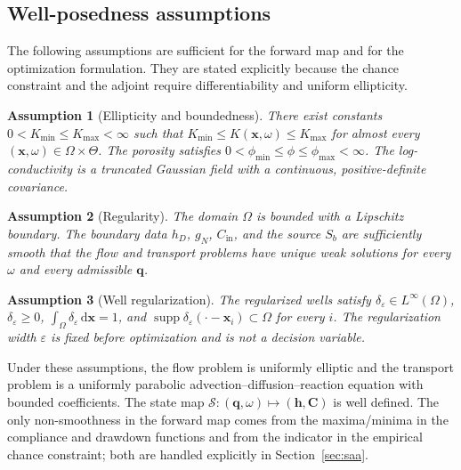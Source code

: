 \documentclass[11pt]{article}
\numberwithin{equation}{section}
\newcommand{\dd}{\,\mathrm{d}}
\newcommand{\xx}{\mathbf{x}}
\theoremstyle{plain}
\newtheorem{assumption}{Assumption}
\begin{document}
\subsection{Well-posedness assumptions}
\label{sec:wellposed}

The following assumptions are sufficient for the forward map and for the
optimization formulation.  They are stated explicitly because the chance
constraint and the adjoint require differentiability and uniform ellipticity.

\begin{assumption}[Ellipticity and boundedness]
\label{ass:elliptic}
There exist constants $0<K_{\min}\le K_{\max}<\infty$ such that
$K_{\min}\le K(\xx,\omega)\le K_{\max}$ for almost every
$(\xx,\omega)\in\Omega\times\Theta$.  The porosity satisfies
$0<\phi_{\min}\le\phi\le\phi_{\max}<\infty$.  The log-conductivity is a
truncated Gaussian field with a continuous, positive-definite covariance.
\end{assumption}

\begin{assumption}[Regularity]
\label{ass:regularity}
The domain $\Omega$ is bounded with a Lipschitz boundary.  The boundary data
$h_D$, $g_N$, $C_{\mathrm{in}}$, and the source $S_b$ are sufficiently smooth
that the flow and transport problems have unique weak solutions for every
$\omega$ and every admissible $\mathbf{q}$.
\end{assumption}

\begin{assumption}[Well regularization]
\label{ass:wellreg}
The regularized wells satisfy $\delta_{\varepsilon}\in L^\infty(\Omega)$,
$\delta_{\varepsilon}\ge0$, $\int_\Omega\delta_{\varepsilon}\dd\xx=1$, and
$\operatorname{supp}\delta_{\varepsilon}(\cdot-\xx_i)\subset\Omega$ for every
$i$.  The regularization width $\varepsilon$ is fixed before optimization and
is not a decision variable.
\end{assumption}

Under these assumptions, the flow problem is uniformly elliptic and the
transport problem is a uniformly parabolic advection--diffusion--reaction
equation with bounded coefficients.  The state map
$\mathcal{S}:(\mathbf{q},\omega)\mapsto(\mathbf{h},\mathbf{C})$ is well
defined.  The only non-smoothness in the forward map comes from the
maxima/minima in the compliance and drawdown functions and from the
indicator in the empirical chance constraint; both are handled explicitly in
Section~\ref{sec:saa}.
\end{document}
